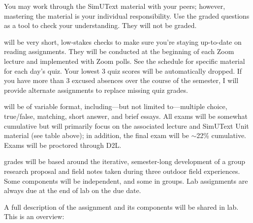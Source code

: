 \documentclass{tufte-handout}
\begin{document}
\begin{fullwidth}

You may work through the SimUText material with your peers; however, mastering the material is your individual responsibility. Use the graded questions as a tool to check your understanding. They will not be graded. 

 will be very short, low-stakes checks to make sure you're staying up-to-date on reading assignments. They will be conducted at the beginning of each Zoom lecture and implemented with Zoom polls. See the schedule for specific material for each day's quiz. Your lowest 3 quiz scores will be automatically dropped. If you have more than 3 excused absences over the course of the semester, I will provide alternate assignments to replace missing quiz grades.

 will be of variable format, including---but not limited to---multiple choice, true/false, matching, short answer, and brief essays. All exams will be somewhat cumulative but will primarily focus on the associated lecture and SimUText Unit material (see table above); in addition, the final exam will be $\sim$22\% cumulative. Exams will be proctored through D2L.



 grades will be based around the iterative, semester-long development of a group research proposal and field notes taken during three outdoor field experiences.  Some components will be independent, and some in groups. Lab assignments are always due at the end of lab on the due date. 

A full description of the assignment and its components will be shared in lab. This is an overview:


\end{fullwidth}
\end{document}
